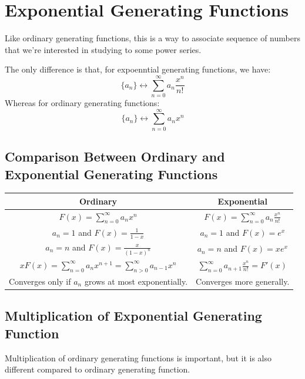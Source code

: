 \documentclass[letterpaper]{article}
\begin{document}
\newpage 
\section{Exponential Generating Functions}
Like ordinary generating functions, this is a way to associate sequence of numbers that we're interested in studying to some power series.

\bigskip 

The only difference is that, for expoenntial generating functions, we have:
\[\{a_n\} \longleftrightarrow \sum_{n = 0}^{\infty} a_n \frac{x^n}{n!}\]
Whereas for ordinary generating functions:
\[\{a_n\} \longleftrightarrow \sum_{n = 0}^{\infty} a_n x^n\]

\subsection{Comparison Between Ordinary and Exponential Generating Functions}
\begin{center}
    \begin{tabular}{c|c}
        \textbf{Ordinary} & \textbf{Exponential} \\ 
        \hline 
        $F(x) = \sum_{n = 0}^{\infty} a_n x^n$ & $F(x) = \sum_{n = 0}^{\infty} a_n \frac{x^n}{n!}$ \\ 
        $a_n = 1$ and $F(x) = \frac{1}{1 - x}$ & $a_n = 1$ and $F(x) = e^x$ \\ 
        $a_n = n$ and $F(x) = \frac{x}{(1 - x)^n}$ & $a_n = n$ and $F(x) = xe^x$ \\ 
        $xF(x) = \sum_{n = 0}^{\infty} a_n x^{n + 1} = \sum_{n > 0}^{\infty} a_{n - 1} x^n$ & $\sum_{n = 0}^{\infty} a_{n + 1} \frac{x^n}{n!} = F'(x)$ \\ 
        Converges only if $a_n$ grows at most exponentially. & Converges more generally.
    \end{tabular}
\end{center}

\subsection{Multiplication of Exponential Generating Function}
Multiplication of ordinary generating functions is important, but it is also different compared to ordinary generating function. 
\end{document}
